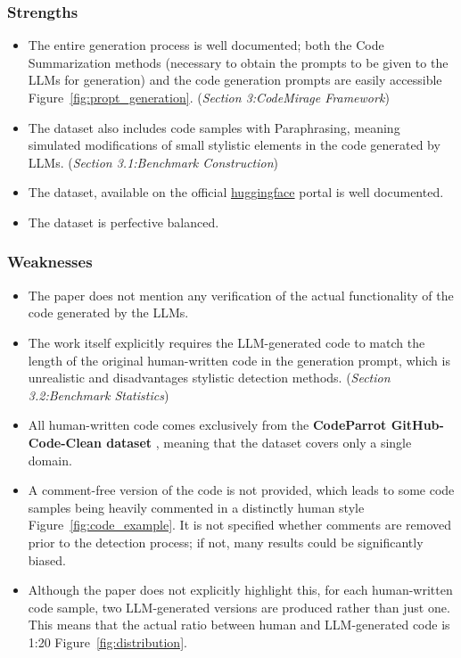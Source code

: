 \subsubsection*{Strengths}
\begin{itemize}
    \item The entire generation process is well documented; both 
    the Code Summarization methods 
    (necessary to obtain the prompts to be given to 
    the LLMs for generation) and the code 
    generation prompts are easily accessible 
    Figure~\ref{fig:propt_generation}. 
    {(\scriptsize\textit{Section 3:CodeMirage Framework})}
    \item The dataset also includes code samples with Paraphrasing, 
    meaning simulated modifications of small stylistic elements 
    in the code generated by LLMs.
    {(\scriptsize\textit{Section 3.1:Benchmark Construction})}
    \item The dataset, available on the official 
    \href{{https://huggingface.co/datasets/HanxiGuo/CodeMirage}}{huggingface} 
    portal is well documented.
    \item The dataset is perfective balanced.
\end{itemize}



\subsubsection*{Weaknesses}
\begin{itemize}
    \item The paper does not mention any verification of 
    the actual functionality of the code generated by the LLMs. 
    \item The work itself explicitly requires the LLM-generated 
    code to match the length of the original human-written 
    code in the generation prompt, which is unrealistic and 
    disadvantages stylistic detection methods.
    {(\scriptsize\textit{Section 3.2:Benchmark Statistics})}
    \item All human-written code comes exclusively from the 
    \textbf{CodeParrot GitHub-Code-Clean dataset} 
    \cite{codeparrot-github-code-clean-2022}, 
    meaning that the dataset covers only a single domain.
    \item A comment-free version of the code is not provided, 
    which leads to some code samples being heavily 
    commented in a distinctly human style
    Figure~\ref{fig:code_example}. 
    It is not specified whether comments are removed prior to the 
    detection process; if not, many results could be 
    significantly biased.
    \item Although the paper does not explicitly highlight this, for each 
    human-written code sample, two LLM-generated versions are produced 
    rather than just one. This means that the actual ratio between human 
    and LLM-generated code is 1:20 Figure~\ref{fig:distribution}. 
\end{itemize}




